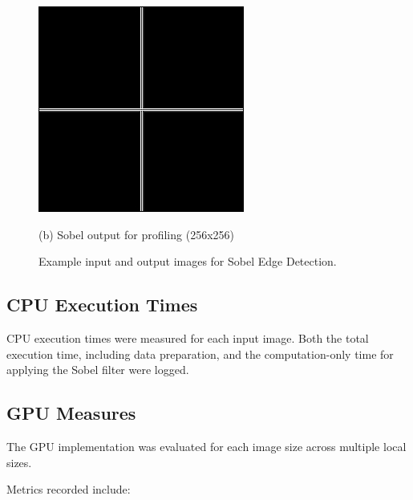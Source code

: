 \documentclass{article}
\begin{document}
\begin{figure}[h!]
\begin{minipage}{0.45\textwidth}
            \includegraphics[width=\textwidth]{./images/output_256x256.jpg} %
            \caption*{(b) Sobel output for profiling (256x256)}
        \end{minipage}
        \caption{Example input and output images for Sobel Edge Detection.}
        \label{fig:input_output_comparison}
    \end{figure}

\subsection*{CPU Execution Times}

CPU execution times were measured for each input image. 
Both the total execution time, including data preparation, and 
the computation-only time for applying the Sobel filter were logged.

\subsection*{GPU Measures}

The GPU implementation was evaluated for each image size across multiple local sizes. 

Metrics recorded include:
\end{document}
